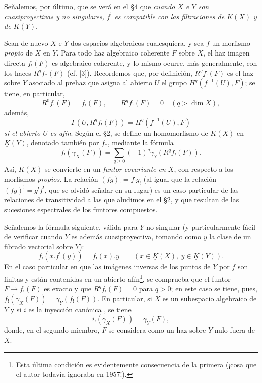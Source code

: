 Señalemos, por último, que se verá en el \S 4 que \emph{cuando $X$ e $Y$ son cuasiproyectivas y no singulares, $f^!$ es compatible con las filtraciones de $\underline K(X)$ y de $\underline K(Y)$}.

Sean de nuevo $X$ e $Y$ dos espacios algebraicos cualesquiera, y sea $f$ un morfismo \emph{propio} de $X$ en $Y$. Para todo haz algebraico coherente $F$ sobre $X$, el haz imagen directa $f_!(F)$ es algebraico coherente, y lo mismo ocurre, más generalmente, con los haces $R^qf_*(F)$ (cf. [3]). Recordemos que, por definición, $R^qf_!(F)$ es el haz sobre $Y$ asociado al prehaz que asigna al abierto $U$ el grupo $H^q(f^{-1}(U),F)$; se tiene, en particular,
\begin{equation}\tag{2.24}
 R^0f_!(F)=f_!(F),\qquad R^qf_!(F)=0\quad(q>\dim X),
\end{equation}
además,
\begin{equation}\tag{2.25}
 \Gamma(U,R^qf_!(F))=H^q(f^{-1}(U),F)
\end{equation}
\emph{si el abierto $U$ es afín}. Según el \S 2, se define un homomorfismo de $\underline K(X)$ en $\underline K(Y)$, denotado también por $f_*$, mediante la fórmula
\begin{equation}\tag{2.26}
 f_!(\gamma_X(F))=\sum_{q\geq0}(-1)^q\gamma_Y(R^qf_!(F)).
\end{equation}
Así, $\underline K(X)$ se convierte en un \emph{funtor covariante en $X$}, con respecto a los morfismos \emph{propios}. La relación $(fg)_!=f_!g_!$ (al igual que la relación $(fg)^!=g^!f^!$, que se olvidó señalar en su lugar) es un caso particular de las relaciones de transitividad a las que aludimos en el \S 2, y que resultan de las sucesiones espectrales de los funtores compuestos.

Señalemos la fórmula siguiente, válida para $Y$ no singular (y particularmente fácil de verificar cuando $Y$ es además cuasiproyectiva, tomando como $y$ la clase de un fibrado vectorial sobre $Y$):
\begin{equation}\tag{2.27}
 f_!(x.f^!(y))=f_!(x).y\qquad(x\in\underline K(X),\ y\in\underline K(Y)).
\end{equation}
En el caso particular en que las imágenes inversas de los puntos de $Y$ por $f$ son finitas y están contenidas en un abierto afín\footnote{Esta última condición es evidentemente consecuencia de la primera (¡cosa que el autor todavía ignoraba en 1957!).}, se comprueba que el funtor $F\longrightarrow f_!(F)$ es exacto y que $R^qf_!(F)=0$ para $q>0$; en este caso se tiene, pues, $f_!(\gamma_X(F))=\gamma_Y(f_!(F))$. En particular, si $X$ es un subespacio algebraico de $Y$ y si $i$ es la inyección canónica , se tiene
\begin{equation}\tag{2.28}
 i_!(\gamma_X(F))=\gamma_Y(F),
\end{equation}
donde, en el segundo miembro, $F$ se considera como un haz sobre $Y$ nulo fuera de $X$.
